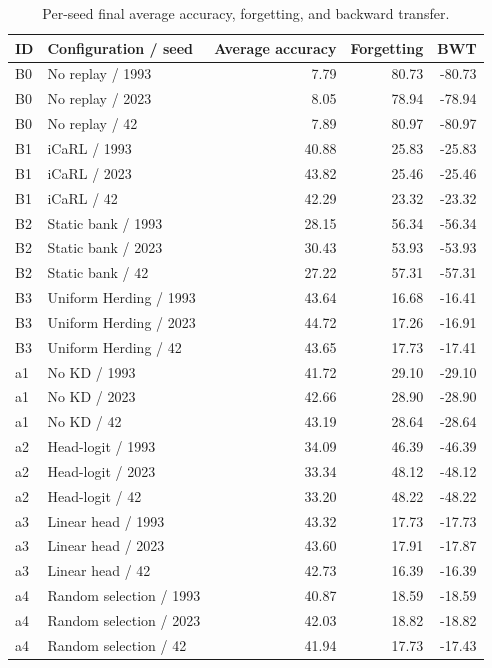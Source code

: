 \begin{table}[htbp]
  \centering
  \caption{Per-seed final average accuracy, forgetting, and backward transfer.}
  \label{tab:app-seeds}
  \scriptsize
  \begin{tabular}{llrrr}
    \toprule
    ID & Configuration / seed & Average accuracy & Forgetting & BWT \\
    \midrule
    B0 & No replay / 1993 & 7.79 & 80.73 & -80.73 \\
    B0 & No replay / 2023 & 8.05 & 78.94 & -78.94 \\
    B0 & No replay / 42 & 7.89 & 80.97 & -80.97 \\
    B1 & iCaRL / 1993 & 40.88 & 25.83 & -25.83 \\
    B1 & iCaRL / 2023 & 43.82 & 25.46 & -25.46 \\
    B1 & iCaRL / 42 & 42.29 & 23.32 & -23.32 \\
    B2 & Static bank / 1993 & 28.15 & 56.34 & -56.34 \\
    B2 & Static bank / 2023 & 30.43 & 53.93 & -53.93 \\
    B2 & Static bank / 42 & 27.22 & 57.31 & -57.31 \\
    B3 & Uniform Herding / 1993 & 43.64 & 16.68 & -16.41 \\
    B3 & Uniform Herding / 2023 & 44.72 & 17.26 & -16.91 \\
    B3 & Uniform Herding / 42 & 43.65 & 17.73 & -17.41 \\
    a1 & No KD / 1993 & 41.72 & 29.10 & -29.10 \\
    a1 & No KD / 2023 & 42.66 & 28.90 & -28.90 \\
    a1 & No KD / 42 & 43.19 & 28.64 & -28.64 \\
    a2 & Head-logit / 1993 & 34.09 & 46.39 & -46.39 \\
    a2 & Head-logit / 2023 & 33.34 & 48.12 & -48.12 \\
    a2 & Head-logit / 42 & 33.20 & 48.22 & -48.22 \\
    a3 & Linear head / 1993 & 43.32 & 17.73 & -17.73 \\
    a3 & Linear head / 2023 & 43.60 & 17.91 & -17.87 \\
    a3 & Linear head / 42 & 42.73 & 16.39 & -16.39 \\
    a4 & Random selection / 1993 & 40.87 & 18.59 & -18.59 \\
    a4 & Random selection / 2023 & 42.03 & 18.82 & -18.82 \\
    a4 & Random selection / 42 & 41.94 & 17.73 & -17.43 \\

\end{tabular}
\end{table}
